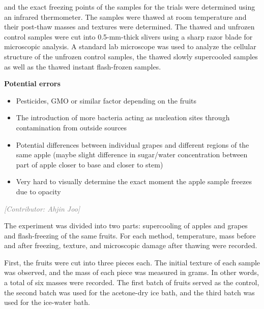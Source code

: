 \documentclass[12pt, a4paper]{article}
\newcommand{\contributor}[1]{\vspace{4pt}\noindent\textcolor{gray}{\small\textit{[Contributor: #1]}}\vspace{2pt}}
\begin{document}

and the exact freezing points of the samples for the trials were
determined using an infrared thermometer. The samples were thawed at
room temperature and their post-thaw masses and textures were
determined. The thawed and unfrozen control samples were cut into
0.5-mm-thick slivers using a sharp razor blade for microscopic
analysis. A standard lab microscope was used to analyze the cellular
structure of the unfrozen control samples, the thawed slowly supercooled
samples as well as the thawed instant flash-frozen samples.


\textbf{Potential errors}

\begin{itemize}
\item Pesticides, GMO or similar factor depending on the fruits
\item The introduction of more bacteria acting as nucleation sites through contamination from outside sources
\item Potential differences between individual grapes and different regions of the same apple (maybe slight difference in sugar/water concentration between part of apple closer to base and closer to stem)
\item Very hard to visually determine the exact moment the apple sample freezes due to opacity
\end{itemize}

\contributor{Ahjin Joo}

The experiment was divided into two parts: supercooling of apples and
grapes and flash-freezing of the same fruits. For each method,
temperature, mass before and after freezing, texture, and microscopic
damage after thawing were recorded.

First, the fruits were cut into three pieces each. The initial texture
of each sample was observed, and the mass of each piece was measured in
grams. In other words, a total of six masses were recorded. The first
batch of fruits served as the control, the second batch was used for the
acetone-dry ice bath, and the third batch was used for the ice-water
bath.
\end{document}
